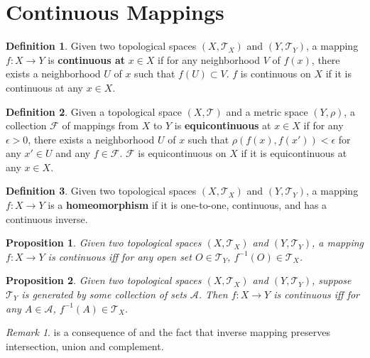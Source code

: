 \documentclass[openany]{book}
\newtheorem{proposition}{Proposition}[chapter]
\theoremstyle{definition}
\newtheorem{definition}{Definition}[chapter]
\theoremstyle{remark}
\newtheorem*{remark}{Remark}
\begin{document}
\section{Continuous Mappings}
\begin{definition}
    Given two topological spaces $(X,\mathcal{T}_X)$ and $(Y,\mathcal{T}_Y)$, a mapping $f:X\to Y$ is \textbf{continuous at} $x\in X$ if for any neighborhood $V$ of $f(x)$, there exists a neighborhood $U$ of $x$ such that $f(U)\subset V$. $f$ is continuous on $X$ if it is continuous at any $x\in X$.
\end{definition}
\begin{definition}
    Given a topological space $(X,\mathcal{T})$ and a metric space $(Y,\rho)$, a collection $\mathcal{F}$ of mappings from $X$ to $Y$ is \textbf{equicontinuous} at $x\in X$ if for any $\epsilon>0$, there exists a neighborhood $U$ of $x$ such that $\rho(f(x),f(x'))<\epsilon$ for any $x'\in U$ and any $f\in \mathcal{F}$. $\mathcal{F}$ is equicontinuous on $X$ if it is equicontinuous at any $x\in X$.
\end{definition}
\begin{definition}
    Given two topological spaces $(X,\mathcal{T}_X)$ and $(Y,\mathcal{T}_Y)$, a mapping $f:X\to Y$ is a \textbf{homeomorphism} if it is one-to-one, continuous, and has a continuous inverse.
\end{definition}

\begin{proposition}\label{prop:contInv}
    Given two topological spaces $(X,\mathcal{T}_X)$ and $(Y,\mathcal{T}_Y)$, a mapping $f:X\to Y$ is continuous iff for any open set $O\in \mathcal{T}_Y$, $f^{-1}(O)\in \mathcal{T}_X$.
\end{proposition}
\begin{proposition}\label{prop:contGen}
    Given two topological spaces $(X,\mathcal{T}_X)$ and $(Y,\mathcal{T}_Y)$, suppose $\mathcal{T}_Y$ is generated by some collection of sets $\mathcal{A}$. Then $f:X\to Y$ is continuous iff for any $A\in \mathcal{A}$, $f^{-1}(A)\in \mathcal{T}_X$.
\end{proposition}
\begin{remark}
     is a consequence of  and the fact that inverse mapping preserves intersection, union and complement.
\end{remark}
\end{document}

